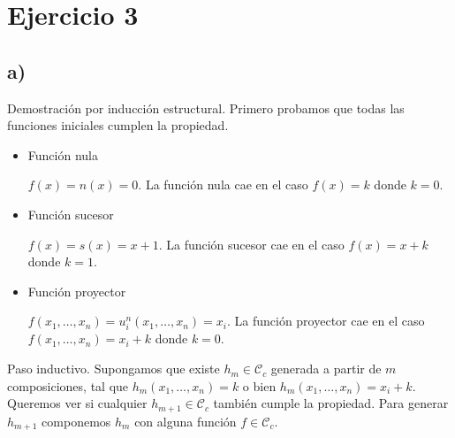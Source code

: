 \section*{Ejercicio 3}

\subsection*{a)}

Demostración por inducción estructural. Primero probamos que todas las funciones iniciales cumplen la propiedad.

\begin{itemize}
    \item Función nula

    $f(x) = n(x) = 0$. La función nula cae en el caso $f(x) = k$ donde $k = 0$.

    \item Función sucesor

    $f(x) = s(x) = x + 1$. La función sucesor cae en el caso $f(x) = x + k$ donde $k = 1$.

    \item Función proyector

    $f(x_1, \dots, x_n) = u^n_i(x_1, \dots, x_n) = x_i$. La función proyector cae en el caso $f(x_1, \dots, x_n) = x_i + k$ donde $k = 0$.
\end{itemize}

Paso inductivo. Supongamos que existe $h_m \in \mathcal{C}_c$ generada a partir de $m$ composiciones, tal que $h_m(x_1, \dots, x_n) = k$ o bien $h_m(x_1, \dots, x_n) = x_i + k$. Queremos ver si cualquier $h_{m+1} \in \mathcal{C}_c$ también cumple la propiedad. Para generar $h_{m+1}$ componemos $h_m$ con alguna función $f \in \mathcal{C}_c$.


